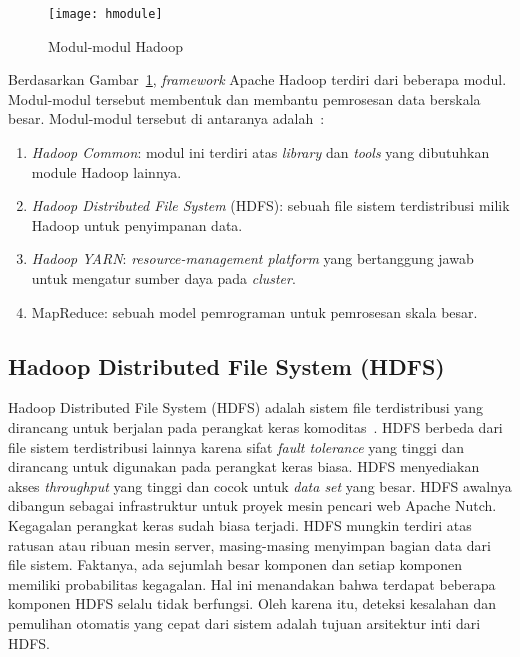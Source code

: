 \begin{figure}[H]
    \centering  
    \texttt{[image: hmodule]}  
    \caption[Modul-modul Hadoop ]{Modul-modul Hadoop} 
    \label{fig:hmodule} 
\end{figure}

Berdasarkan Gambar~\ref{fig:hmodule}, \textit{framework} Apache Hadoop terdiri dari beberapa modul. Modul-modul tersebut membentuk dan membantu pemrosesan data berskala besar. Modul-modul tersebut di antaranya adalah~\cite{tomwhite:05:htdg}:

\begin{enumerate}
\item \textit{Hadoop Common}: modul ini terdiri atas \textit{library} dan \textit{tools} yang dibutuhkan module Hadoop lainnya.

\item \textit{Hadoop Distributed File System} (HDFS): sebuah file sistem terdistribusi milik Hadoop untuk penyimpanan data.

\item \textit{Hadoop YARN}: \textit{resource-management platform} yang bertanggung jawab untuk mengatur sumber daya pada \textit{cluster}.

\item MapReduce: sebuah model pemrograman untuk pemrosesan skala besar.

\end{enumerate}

\subsection{Hadoop Distributed File System (HDFS)}

Hadoop Distributed File System (HDFS) adalah sistem file terdistribusi yang dirancang untuk berjalan pada perangkat keras komoditas~\cite{tomwhite:05:htdg}. HDFS berbeda dari file sistem terdistribusi lainnya  karena sifat \textit{fault tolerance} yang tinggi dan dirancang untuk digunakan pada perangkat keras biasa. HDFS menyediakan akses \textit{throughput} yang tinggi dan cocok untuk \textit{data set} yang besar. HDFS awalnya dibangun sebagai infrastruktur untuk proyek mesin pencari web Apache Nutch.\\

Kegagalan perangkat keras sudah biasa terjadi. HDFS mungkin terdiri atas ratusan atau ribuan mesin server, masing-masing menyimpan bagian data dari file sistem. Faktanya, ada sejumlah besar komponen dan setiap komponen memiliki probabilitas kegagalan. Hal ini  menandakan bahwa terdapat beberapa komponen HDFS selalu tidak berfungsi. Oleh karena itu, deteksi kesalahan dan pemulihan otomatis yang cepat dari sistem adalah tujuan arsitektur inti dari HDFS.\\

